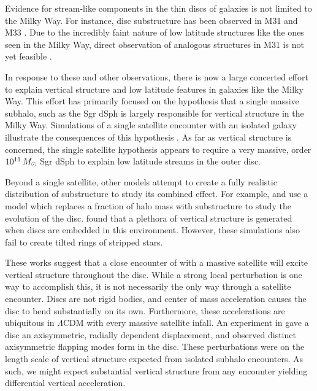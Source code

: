 Evidence for stream-like components in the thin discs of galaxies is not limited to the Milky Way. For instance, disc substructure has been observed in M31 \citep{richardson_2008_m31, dorman_2013_m31, bernard_2015_m31} and M33 \citep{mcconnachie_2006_m33, mcconnachie_2010_m33}. Due to the incredibly faint nature of low latitude structures like the ones seen in the Milky Way, direct observation of analogous structures in M31 is not yet feasible \citep{johnston_kud_review}. 



%
In response to these and other observations, there is now a large concerted effort to explain vertical structure and low latitude features in galaxies like the Milky Way. This effort has primarily focused on the hypothesis that a single massive subhalo, such as the Sgr dSph \citep{ibata_discovery} is largely responsible for vertical structure in the Milky Way. Simulations of a single satellite encounter with an isolated galaxy illustrate the consequences of this hypothesis \citep[for example]{purcell2011,gomez_2013,widrow_2014,feldmann_2015, dlv_2015, donghia_2016, laporte_2016, laporte_2018, laporte_2018_b}. As far as vertical structure is concerned, the single satellite hypothesis appears to require a very massive, order $10^{11}\,M_\odot$ Sgr dSph to explain low latitude streams in the outer disc. 

Beyond a single satellite, other models attempt to create a fully realistic distribution of substructure to study its combined effect. For example, \citet{gauthier_2006} and \citet{chequers_2018} use a model which replaces a fraction of halo mass with substructure to study the evolution of the disc. \citet{chequers_2018} found that a plethora of vertical structure is generated when discs are embedded in this environment. However, these simulations also fail to create tilted rings of stripped stars.


These works suggest that a close encounter of with a massive satellite will excite vertical structure throughout the disc. While a strong local perturbation is one way to accomplish this, it is not necessarily the only way through a satellite encounter. Discs are not rigid bodies, and center of mass acceleration causes the disc to bend substantially on its own. Furthermore, these accelerations are ubiquitous in $\Lambda$CDM with every massive satellite infall. An experiment in \citet{sellwood_1996} gave a disc an axisymmetric, radially dependent displacement, and observed distinct axisymmetric flapping modes form in the disc. These perturbations were on the length scale of vertical structure expected from isolated subhalo encounters. As such, we might expect substantial vertical structure from any encounter yielding differential vertical acceleration.

